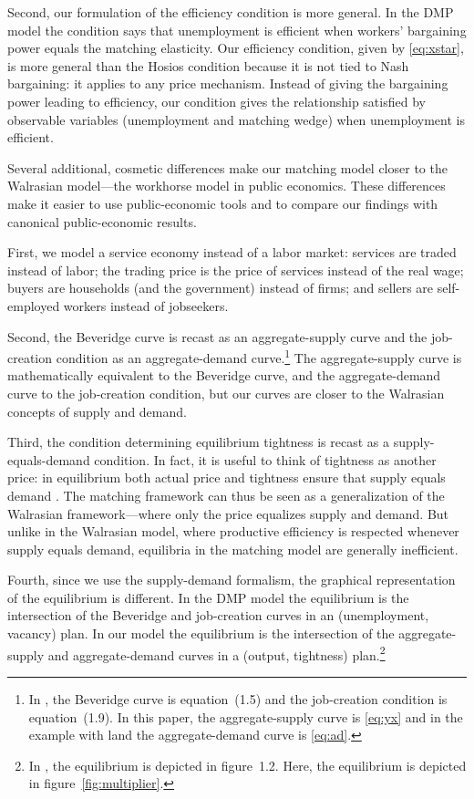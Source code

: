 \documentclass[letterpaper,12pt,leqno]{article}
\begin{document}
\begin{bibunit}
Second, our formulation of the efficiency condition is more general. In the DMP model the  condition says that unemployment is efficient when workers' bargaining power equals the matching elasticity. Our efficiency condition, given by \eqref{eq:xstar}, is more general than the Hosios condition because it is not tied to Nash bargaining: it applies to any price mechanism. Instead of giving the bargaining power leading to efficiency, our condition gives the relationship satisfied by observable variables (unemployment and matching wedge) when unemployment is efficient.

Several additional, cosmetic differences make our matching model closer to the Walrasian model---the workhorse model in public economics. These differences make it easier to use public-economic tools and to compare our findings with canonical public-economic results.

First, we model a service economy instead of a labor market: services are traded instead of labor; the trading price is the price of services instead of the real wage; buyers are households (and the government) instead of firms; and sellers are self-employed workers instead of jobseekers.

Second, the Beveridge curve is recast as an aggregate-supply curve and the job-creation condition as an aggregate-demand curve.\footnote{In , the Beveridge curve is equation~(1.5) and the job-creation condition is equation~(1.9). In this paper, the aggregate-supply curve is \eqref{eq:yx} and in the example with land the aggregate-demand curve is \eqref{eq:ad}.} The aggregate-supply curve is mathematically equivalent to the Beveridge curve, and the aggregate-demand curve to the job-creation condition, but our curves are closer to the Walrasian concepts of supply and demand.

Third, the condition determining equilibrium tightness is recast as a supply-equals-demand condition. In fact, it is useful to think of tightness as another price: in equilibrium both actual price and tightness ensure that supply equals demand . The matching framework can thus be seen as a generalization of the Walrasian framework---where only the price equalizes supply and demand. But unlike in the Walrasian model, where productive efficiency is respected whenever supply equals demand, equilibria in the matching model are generally inefficient. 

Fourth, since we use the supply-demand formalism, the graphical representation of the equilibrium is different. In the DMP model the equilibrium is the intersection of the Beveridge and job-creation curves in an (unemployment, vacancy) plan. In our model the equilibrium is the intersection of the aggregate-supply and aggregate-demand curves in a (output, tightness) plan.\footnote{In , the equilibrium is depicted in figure~1.2. Here, the equilibrium is depicted in figure~\ref{fig:multiplier}.}


\end{bibunit}
\end{document}
